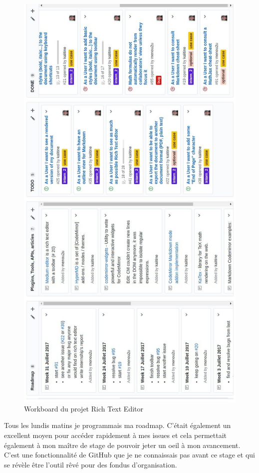 \documentclass[12pt]{article}
\begin{document}
\newpage
\begin{figure}[H]
\centering
\includegraphics[scale=0.52]{gallery/workboard.jpg}
\caption[nom dans le sommaire]{Workboard du projet Rich Text Editor}
\label{fig:gallery1}
\end{figure}

\newpage
Tous les lundis matins je programmais ma roadmap. C'était également un excellent moyen pour accéder rapidement à mes issues et cela permettait également à mon maître de stage de pouvoir jeter un oeil à mon avancement. C'est une fonctionnalité de GitHub que je ne connaissais pas avant ce stage et qui se révèle être l'outil rêvé pour des fondus d'organisation.
\end{document}
